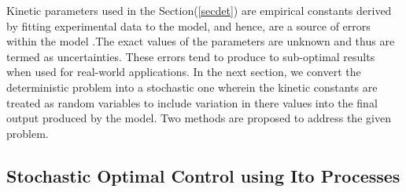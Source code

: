 \documentclass[3p,times]{elsarticle}
\begin{document}
Kinetic parameters used in the Section(\ref{secdet}) are empirical constants derived by fitting experimental data to the model, and hence, are a source of errors within the model .The exact values of the parameters are unknown and thus are termed as uncertainties. These errors tend to produce to sub-optimal results when used for real-world applications. In the next section, we convert the deterministic problem into a stochastic one wherein the kinetic constants are treated as random variables to include variation in there values into the final output produced by the model. Two methods are proposed to address the given problem. 
\subsection{Stochastic Optimal Control using Ito Processes}
\end{document}
